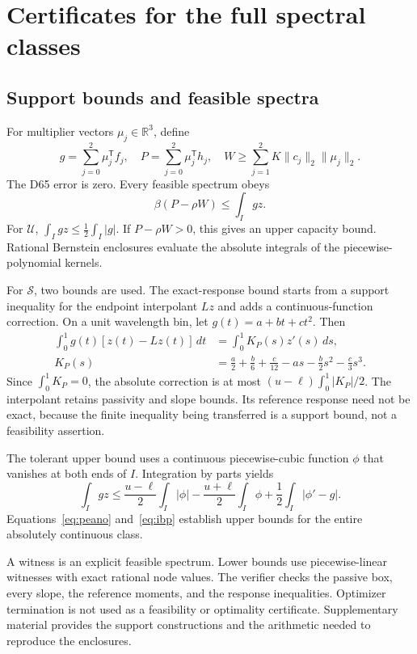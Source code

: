 \documentclass{optica-article}
\begin{document}
\section{Certificates for the full spectral classes}
\subsection{Support bounds and feasible spectra}
For multiplier vectors $\mu_j\in\mathbb R^3$, define
\begin{equation}
 g=\sum_{j=0}^2\mu_j^{\mathsf T}f_j,\quad
 P=\sum_{j=0}^2\mu_j^{\mathsf T}h_j,\quad
 W\geq\sum_{j=1}^2K\|c_j\|_2\|\mu_j\|_2.
 \label{eq:dual}
\end{equation}
The D65 error is zero. Every feasible spectrum obeys
\begin{equation}
 \beta(P-\rho W)\leq\int_Igz.
 \label{eq:support}
\end{equation}
For $\mathcal U$, $\int_Igz\leq\tfrac12\int_I|g|$. If $P-\rho W>0$, this gives an upper capacity bound. Rational Bernstein enclosures evaluate the absolute integrals of the piecewise-polynomial kernels.

For $\mathcal S$, two bounds are used. The exact-response bound starts from a support inequality for the endpoint interpolant $Lz$ and adds a continuous-function correction. On a unit wavelength bin, let $g(t)=a+bt+ct^2$. Then
\begin{align}
 \int_0^1g(t)[z(t)-Lz(t)]\,dt&=\int_0^1K_P(s)z'(s)\,ds,\\
 K_P(s)&=\frac a2+\frac b6+\frac c{12}-as-\frac b2s^2-\frac c3s^3.
 \label{eq:peano}
\end{align}
Since $\int_0^1K_P=0$, the absolute correction is at most $(u-\ell)\int_0^1|K_P|/2$. The interpolant retains passivity and slope bounds. Its reference response need not be exact, because the finite inequality being transferred is a support bound, not a feasibility assertion.

The tolerant upper bound uses a continuous piecewise-cubic function $\phi$ that vanishes at both ends of $I$. Integration by parts yields
\begin{equation}
 \int_Igz\leq\frac{u-\ell}{2}\int_I|\phi|
 -\frac{u+\ell}{2}\int_I\phi+\frac12\int_I|\phi'-g|.
 \label{eq:ibp}
\end{equation}
Equations~\eqref{eq:peano} and~\eqref{eq:ibp} establish upper bounds for the entire absolutely continuous class.

A witness is an explicit feasible spectrum. Lower bounds use piecewise-linear witnesses with exact rational node values. The verifier checks the passive box, every slope, the reference moments, and the response inequalities. Optimizer termination is not used as a feasibility or optimality certificate. Supplementary material provides the support constructions and the arithmetic needed to reproduce the enclosures.
\end{document}

